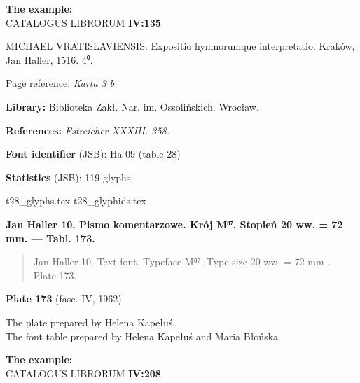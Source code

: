 \documentclass[12pt]{article}
\newcommand{\bg}{\begingl}
\newcommand{\pismoPL}[1]{{\relsize{2}\Junicode\textbf{#1}}}
\newcommand{\pismoEN}[1]{{\relsize{1}\Junicode\begin{quote}#1\end{quote}}}
\newcommand{\plate}[3]{\textbf{Plate #1} (fasc. #2, #3)}
\newcommand{\exampleBib}[1]{{\relsize{2}\Junicode\textbf{The
      example:}\\[2ex] CATALOGUS LIBRORUM \textbf{#1}}}
\newcommand{\exampleDesc}[1]{{\relsize{0}\Junicode#1}}
\newcommand{\exampleDig}[1]{{\relsize{0}\Junicode \textbf{Digitization(s) [JSB]:} #1}}
\newcommand{\exampleLib}[1]{{\relsize{0}\Junicode \textbf{Library:} #1}}
\newcommand{\examplePL}[1]{}
\newcommand{\exampleEN}[1]{}
\newcommand{\fontID}[2]{{\relsize{1}\Junicode\textbf{Font identifier} (JSB): #1 (table #2)}}
\newcommand{\fontstat}[1]{{\relsize{1}\Junicode\textbf{Statistics} (JSB): #1 glyphs.}}
\newcommand{\exampleRef}[1]{{\relsize{0}\Junicode \textbf{References:} #1}}
\newcommand{\examplePage}[1]{{Page reference: \relsize{0}\Junicode#1}}
\begin{document}
\bigskip

\exampleBib{IV:135}

\bigskip


\exampleDesc{MICHAEL VRATISLAVIENSIS: Expositio hymnorumque interpretatio. Kraków, Jan Haller, 1516. 4⁰.}
  

\medskip
\examplePage{\textit{Karta 3 b}}

  \bigskip
\exampleLib{Biblioteka Zakł. Nar. im. Ossolińskich. Wrocław.}


\bigskip
\exampleRef{\textit{Estreicher XXXIII. 358.}}


\bigskip

\examplePL{Pismo 3: naglówek. — Pismo 9: tekst i pierwszy zestaw. —
  Rubryka \beta{} z pismem 9. — Cyfry 7: z pismem 9.  z pismem 13. [\ldots]}

    \medskip

    \exampleEN{Font 3: the header. — Font 9: the text and the first character set. — Rubric \beta{} with digits from font 9}


\bigskip


\fontID{Ha-09}{28}

\fontstat{119}

  {t28_glyphs.tex}
  {t28_glyphids.tex}


 \newpage




  \pismoPL{Jan Haller 10. Pismo komentarzowe. Krój M⁸⁷. Stopień 20 ww. = 72 mm. — Tabl. 173.}
  
  \pismoEN{Jan Haller 10. Text font. Typeface M⁸⁷. Type size 20 ww. =
    72 mm . — Plate 173.}

\plate{173}{IV}{1962}

The plate prepared by Helena Kapełuś.\\
The font table prepared by Helena Kapełuś and Maria Błońska.

\bigskip

\exampleBib{IV:208}

\bigskip
\end{document}
